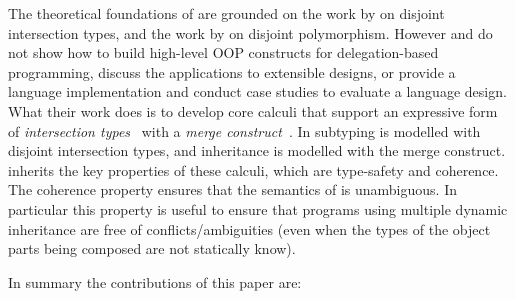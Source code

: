 The theoretical foundations of \name are grounded on the work by
\citet{oliveira2016disjoint} on disjoint intersection types, and the work by
\citet{alpuimdisjoint} on disjoint polymorphism. However
\citeauthor{oliveira2016disjoint} and \citeauthor{alpuimdisjoint}
 do not show how to build high-level OOP constructs for
delegation-based programming, discuss the applications to extensible designs, or
provide a language implementation and conduct case studies to evaluate a
language design. What their work does is to develop core calculi that support an
expressive form of \emph{intersection
  types}~\cite{coppo1981functional,pottinger1980type} with a \emph{merge
  construct}~\cite{dunfield2014elaborating}. In \name subtyping is modelled with
disjoint intersection types, and inheritance is modelled with the merge
construct. \name inherits the key properties of these calculi, which are
type-safety and coherence. The coherence property ensures that the semantics of
\name is unambiguous. In particular this property is useful to ensure that
programs using multiple dynamic inheritance are free of conflicts/ambiguities
(even when the types of the object parts being composed are not statically
know).
  
\begin{comment}
The
novelty of the work in this paper is a three-fold. Firstly we show how
to develop and implement a statically typed, delegation-based OOP
source language on top of core language constructs provided by
disjoint intersection types. Secondly we illustrate the applications
of those high-level constructs to solve issues that show up in
extensibility designs. Finally, we provide a case study on
modularization of language components.
\end{comment}

In summary the contributions of this paper are:

